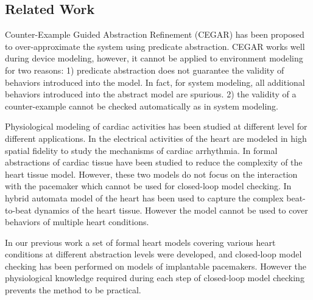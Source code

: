\subsection{Related Work}
Counter-Example Guided Abstraction Refinement (CEGAR) \cite{CEGAR} has been proposed to over-approximate the system using predicate abstraction. 
CEGAR works well during device modeling, however, it cannot be applied to environment modeling for two reasons: 1) predicate abstraction does not guarantee the validity of behaviors introduced into the model. In fact, for system modeling, all additional behaviors introduced into the abstract model are spurious. 2) the validity of a counter-example cannot be checked automatically as in system modeling. 

Physiological modeling of cardiac activities has been studied at different level for different applications. In \cite{natalia} the electrical activities of the heart are modeled in high spatial fidelity to study the mechanisms of cardiac arrhythmia. In \cite{radu} formal abstractions of cardiac tissue have been studied to reduce the complexity of the heart tissue model. However, these two models do not focus on the interaction with the pacemaker which cannot be used for closed-loop model checking. In \cite{marta} hybrid automata model of the heart has been used to capture the complex beat-to-beat dynamics of the heart tissue. However the model cannot be used to cover behaviors of multiple heart conditions.

In our previous work \cite{sttt13} a set of formal heart models covering various heart conditions at different abstraction levels were developed, and closed-loop model checking has been performed on models of implantable pacemakers. 
However the physiological knowledge required during each step of closed-loop model checking prevents the method to be practical.

